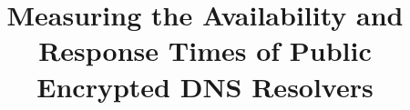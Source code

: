 \documentclass[runningheads]{llncs}
\begin{document}
\title{Measuring the Availability and Response Times of Public Encrypted DNS Resolvers}
\author{}
\institute{}


\maketitle

\begin{sloppypar}





\label{lastpage}

\pagebreak



\end{sloppypar}
\end{document}
